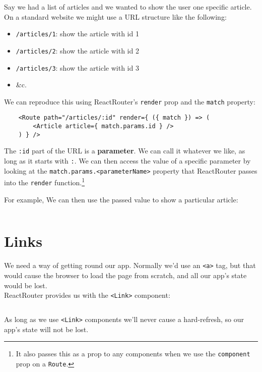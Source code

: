Say we had a list of articles and we wanted to show the user one specific article. On a standard website we might use a URL structure like the following:

\begin{itemize}
    \item \texttt{/articles/1}: show the article with id 1
    \item \texttt{/articles/2}: show the article with id 2
    \item \texttt{/articles/3}: show the article with id 3
    \item \&c.
\end{itemize}

We can reproduce this using ReactRouter's \texttt{render} prop and the \texttt{match} property:

\begin{verbatim}
    <Route path="/articles/:id" render={ ({ match }) => (
        <Article article={ match.params.id } />
    ) } />
\end{verbatim}

The \texttt{:id} part of the URL is a \textbf{parameter}. We can call it whatever we like, as long as it starts with \texttt{:}. We can then access the value of a specific parameter by looking at the \texttt{match.params.<parameterName>} property that ReactRouter passes into the \texttt{render} function.\footnote{It also passes this as a prop to any components when we use the \texttt{component} prop on a \texttt{Route}.}


\pagebreak


For example, We can then use the passed value to show a particular article:

\inputminted{jsx}{06-router/figures/03-Article.jsx}



\section{Links}

We need a way of getting round our app. Normally we'd use an \texttt{<a>} tag, but that would cause the browser to load the page from scratch, and all our app's state would be lost.
\\

ReactRouter provides us with the \texttt{<Link>} component:

\inputminted{jsx}{06-router/figures/04-Link.jsx}

As long as we use \texttt{<Link>} components we'll never cause a hard-refresh, so our app's state will not be lost.
\\

